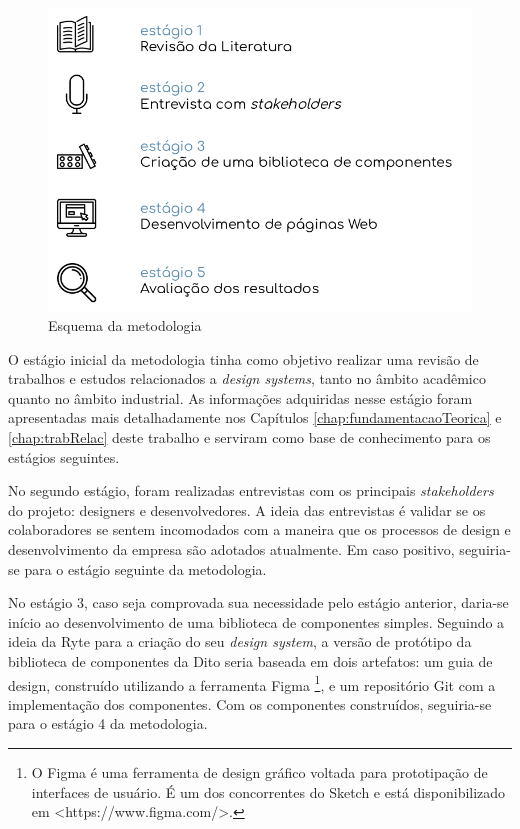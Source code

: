 \begin{figure}
	\includegraphics[width=\linewidth]{./04-figuras/04_metodologia/metodologia.png}
  \caption{Esquema da metodologia}
  \label{fig:metodology}
\end{figure}

O estágio inicial da metodologia tinha como objetivo realizar uma revisão de trabalhos e estudos relacionados a \textit{design systems}, tanto no âmbito acadêmico quanto no âmbito industrial. As informações adquiridas nesse estágio foram apresentadas mais detalhadamente nos Capítulos \ref{chap:fundamentacaoTeorica} e \ref{chap:trabRelac} deste trabalho e serviram como base de conhecimento para os estágios seguintes.

No segundo estágio, foram realizadas entrevistas com os principais \textit{stakeholders} do projeto: designers e desenvolvedores. A ideia das entrevistas é validar se os colaboradores se sentem incomodados com a maneira que os processos de design e desenvolvimento da empresa são adotados atualmente. Em caso positivo, seguiria-se para o estágio seguinte da metodologia.

No estágio 3, caso seja comprovada sua necessidade pelo estágio anterior, daria-se início ao desenvolvimento de uma biblioteca de componentes simples. Seguindo a ideia da Ryte \cite{ryteDesignSystem} para a criação do seu \textit{design system}, a versão de protótipo da biblioteca de componentes da Dito seria baseada em dois artefatos: um guia de design, construído utilizando a ferramenta Figma \footnote{O Figma é uma ferramenta de design gráfico voltada para prototipação de interfaces de usuário. É um dos concorrentes do Sketch e está disponibilizado em <https://www.figma.com/>.}, e um repositório Git com a implementação dos componentes. Com os componentes construídos, seguiria-se para o estágio 4 da metodologia.

